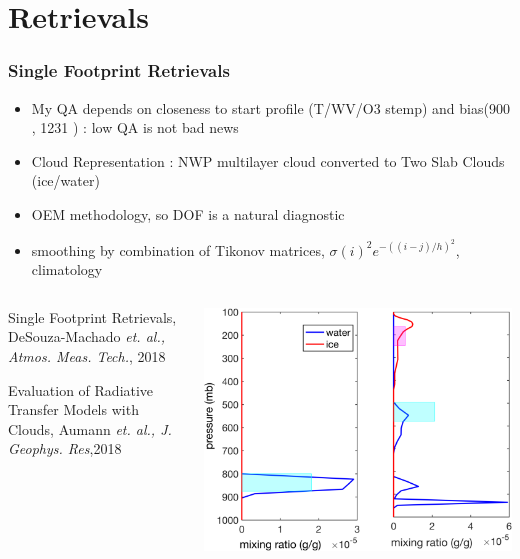 \documentclass[10pt,t]{beamer}
\begin{document}
\section{Retrievals}
\begin{frame}
  \frametitle{Single Footprint Retrievals}
  \begin{itemize}
  \item My QA depends on closeness to start profile (T/WV/O3 stemp)
    and bias(900 \wn, 1231 \wn) : low QA is not bad news
  \item Cloud Representation : NWP multilayer cloud converted to Two Slab
    Clouds (ice/water)
  \item OEM methodology, so DOF is a natural diagnostic
  \item smoothing by combination of Tikonov matrices,
    $\sigma(i)^2 e^{-((i-j)/h)^2}$, climatology
  \end{itemize}

  \begin{columns}[T] %
    \begin{column}{.38\textwidth}

      \small

      Single Footprint Retrievals, DeSouza-Machado {\em et. al., Atmos. Meas. Tech.}, 2018 \newline

      Evaluation of Radiative Transfer Models with Clouds, Aumann {\em et. al., J. Geophys. Res},2018

    \end{column}%
    \hfill%
    \begin{column}{.58\textwidth}

      \centering
      \includegraphics[width=0.75\linewidth]{Figs/FigsRetr/clouds_profileG040_271_321_lls.png}
    \end{column}%
  \end{columns}

\end{frame}
\end{document}

